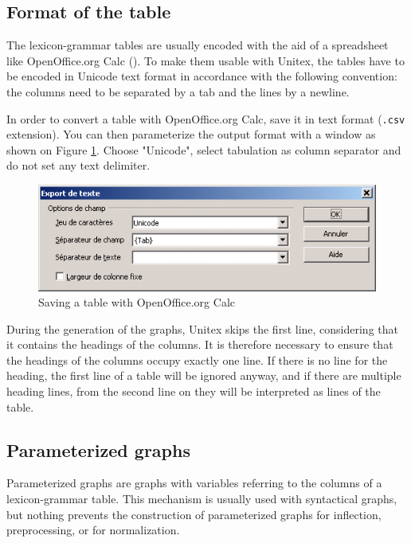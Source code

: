 \subsection{Format of the table}
The lexicon-grammar tables are usually encoded with the aid of a spreadsheet like
OpenOffice.org Calc (\cite{OpenOffice}). To make them usable with Unitex, the
tables have to be encoded in Unicode text format in accordance with the following
convention: the columns need to be separated by a tab and the lines by a newline.

\bigskip
\noindent In order to convert a table with OpenOffice.org Calc, save it in text
format (\verb$.csv$ extension). You can then parameterize the output format with a
window as shown on Figure \ref{fig-csv-export}. Choose "Unicode", select
tabulation as column separator and do not set any text delimiter.

\begin{figure}[!ht]
\begin{center}
\includegraphics[width=12cm]{resources/img/fig8-2.png}
\caption{Saving a table with OpenOffice.org Calc\label{fig-csv-export}}
\end{center}
\end{figure}

\bigskip
\noindent During the generation of the graphs, Unitex skips the first line, 
considering that it
contains the headings of the columns. It is therefore necessary to ensure that
the headings of the columns occupy exactly one line. If there is no line for the
heading, the first line of a table will be ignored anyway, and if there are
multiple heading lines, from the second line on they will be interpreted as lines
of the table.


\subsection{Parameterized graphs}
Parameterized graphs are graphs with variables referring to the columns of a
lexicon-grammar table. This mechanism is usually used with syntactical
graphs, but nothing prevents the construction of parameterized graphs for
inflection, preprocessing, or for normalization.

